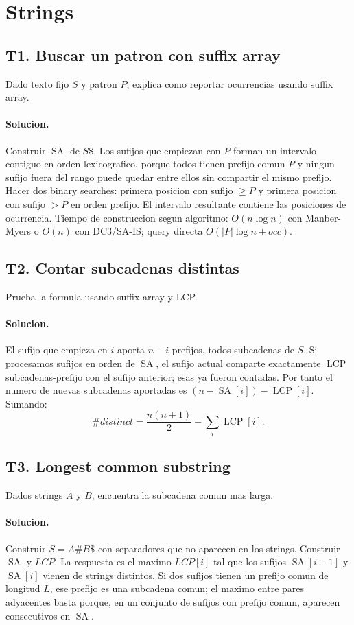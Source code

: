 \documentclass[10pt]{article}
\newcommand{\bigO}{O}
\newcommand{\lcp}{\operatorname{LCP}}
\newcommand{\SA}{\operatorname{SA}}
\begin{document}
\section{Strings}

\subsection*{T1. Buscar un patron con suffix array}
Dado texto fijo $S$ y patron $P$, explica como reportar ocurrencias usando
suffix array.

\paragraph{Solucion.}
Construir $\SA$ de $S\$$. Los sufijos que empiezan con $P$ forman un intervalo
contiguo en orden lexicografico, porque todos tienen prefijo comun $P$ y ningun
sufijo fuera del rango puede quedar entre ellos sin compartir el mismo prefijo.
Hacer dos binary searches: primera posicion con sufijo $\ge P$ y primera posicion
con sufijo $>P$ en orden prefijo. El intervalo resultante contiene las posiciones
de ocurrencia. Tiempo de construccion segun algoritmo: $\bigO(n\log n)$ con
Manber-Myers o $\bigO(n)$ con DC3/SA-IS; query directa
$\bigO(|P|\log n + occ)$.

\subsection*{T2. Contar subcadenas distintas}
Prueba la formula usando suffix array y LCP.

\paragraph{Solucion.}
El sufijo que empieza en $i$ aporta $n-i$ prefijos, todos subcadenas de $S$.
Si procesamos sufijos en orden de $\SA$, el sufijo actual comparte exactamente
$\lcp$ subcadenas-prefijo con el sufijo anterior; esas ya fueron contadas. Por
tanto el numero de nuevas subcadenas aportadas es
$(n-\SA[i])-\lcp[i]$. Sumando:
\[
\#distinct = \frac{n(n+1)}2 - \sum_i \lcp[i].
\]

\subsection*{T3. Longest common substring}
Dados strings $A$ y $B$, encuentra la subcadena comun mas larga.

\paragraph{Solucion.}
Construir $S=A\#B\$$ con separadores que no aparecen en los strings. Construir
$\SA$ y $LCP$. La respuesta es el maximo $LCP[i]$ tal que los sufijos
$\SA[i-1]$ y $\SA[i]$ vienen de strings distintos. Si dos sufijos tienen un
prefijo comun de longitud $L$, ese prefijo es una subcadena comun; el maximo
entre pares adyacentes basta porque, en un conjunto de sufijos con prefijo comun,
aparecen consecutivos en $\SA$.
\end{document}
